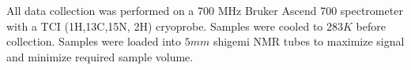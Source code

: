 All data collection was performed on a 700 MHz Bruker Ascend 700 spectrometer with a TCI (1H,13C,15N, 2H) cryoprobe. Samples were cooled to $283K$ before collection. Samples were loaded into $5mm$ shigemi NMR tubes to maximize signal and minimize required sample volume. 